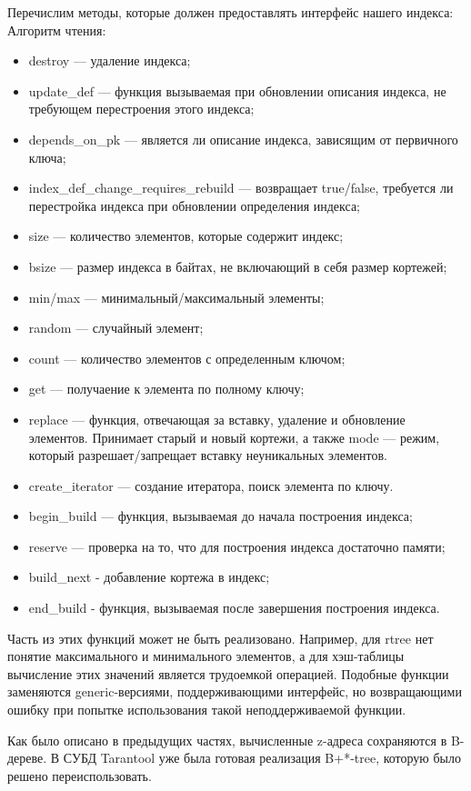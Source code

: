 Перечислим методы, которые должен предоставлять интерфейс нашего индекса:
Алгоритм чтения:
\begin{itemize}
	\item destroy --- удаление индекса;
	\item update\_def --- функция вызываемая при обновлении описания индекса, не требующем перестроения этого индекса;
	\item depends\_on\_pk --- является ли описание индекса, зависящим от первичного ключа;
	\item index\_def\_change\_requires\_rebuild --- возвращает true/false, требуется ли перестройка индекса при обновлении определения индекса;
	\item size --- количество элементов, которые содержит индекс;
	\item bsize --- размер индекса в байтах, не включающий в себя размер кортежей;
	\item min/max --- минимальный/максимальный элементы;
	\item random --- случайный элемент;
	\item count --- количество элементов с определенным ключом;
	\item get --- получаение к элемента по полному ключу;
	\item replace --- функция, отвечающая за вставку, удаление и обновление элементов. Принимает старый и новый кортежи, а также mode --- режим, который разрешает/запрещает вставку неуникальных элементов.
	\item create\_iterator --- создание итератора, поиск элемента по ключу.
	\item begin\_build --- функция, вызываемая до начала построения индекса;
	\item reserve --- проверка на то, что для построения индекса достаточно памяти;
	\item build\_next - добавление кортежа в индекс;
	\item end\_build - функция, вызываемая после завершения построения индекса.
\end{itemize}

Часть из этих функций может не быть реализовано.
Например, для rtree нет понятие максимального и минимального элементов,
а для хэш-таблицы вычисление этих значений является трудоемкой операцией.
Подобные функции заменяются generic-версиями,
поддерживающими интерфейс, но возвращающими ошибку
при попытке использования такой неподдерживаемой функции.

Как было описано в предыдущих частях, вычисленные z-адреса сохраняются в B-дереве. В СУБД Tarantool уже была готовая реализация B+*-tree, которую было решено переиспользовать.

